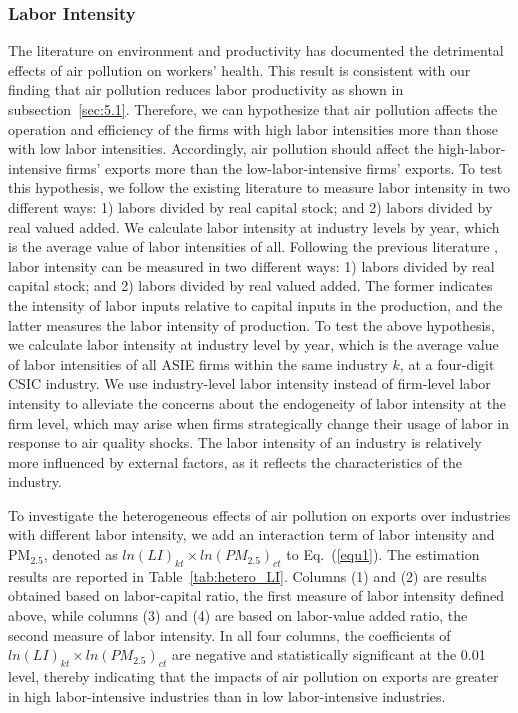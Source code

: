 \documentclass[12pt]{article}
\begin{document}
\subsubsection{Labor Intensity}

\label{sec:5.2.2} The literature on environment and productivity %
\citep[e.g.,][]{chang2016particulate,adhvaryu2022management} has documented the
detrimental effects of air pollution on workers' health. This result is
consistent with our finding that air pollution reduces labor productivity as
shown in subsection~\ref{sec:5.1}. Therefore, we can hypothesize that air
pollution affects the operation and efficiency of the firms with high labor
intensities more than those with low labor intensities. Accordingly, air
pollution should affect the high-labor-intensive firms' exports more than
the low-labor-intensive firms' exports. To test this hypothesis, we follow
the existing literature \citep[e.g.,][]{dewenter2001state} to measure labor
intensity in two different ways: 1) labors divided by real capital stock;
and 2) labors divided by real valued added. We calculate labor intensity at
industry levels by year, which is the average value of
labor intensities of all. Following the previous literature %
\citep{dewenter2001state}, labor intensity can be measured in two different
ways: 1) labors divided by real capital stock; and 2) labors divided by real
valued added. The former indicates the intensity of labor inputs relative to capital 
inputs in the production, and the latter measures the labor intensity of production. 
To test the above hypothesis, we calculate labor
intensity at industry level by year, which is the average value of labor
intensities of all ASIE firms within the same industry $k$, at a four-digit CSIC industry. We use industry-level labor intensity
instead of firm-level labor intensity to alleviate the concerns about the
endogeneity of labor intensity at the firm level, which may arise when firms
strategically change their usage of labor in response to air quality shocks.
The labor intensity of an industry is relatively more influenced by external factors, as it reflects
the characteristics of the industry.

To investigate the heterogeneous effects of air pollution on exports over
industries with different labor intensity, we add an interaction term of
labor intensity and $\mathrm{PM_{2.5}}$, denoted as $ln(LI)_{kt} \times ln(PM_{2.5})_{ct}$ to Eq.~(\ref{equ1}). The estimation results are reported in
Table~\ref{tab:hetero_LI}. Columns (1) and (2) are results obtained based on labor-capital ratio, the first measure of labor intensity defined above, while columns (3) and (4) are based on labor-value added ratio, the second measure of labor intensity. 
In all four columns, the coefficients of $ln(LI)_{kt} \times ln(PM_{2.5})_{ct}$ are negative and statistically significant at the 0.01 level,
thereby indicating that the impacts of air pollution on exports are greater in high
labor-intensive industries than in low labor-intensive industries.
\end{document}
